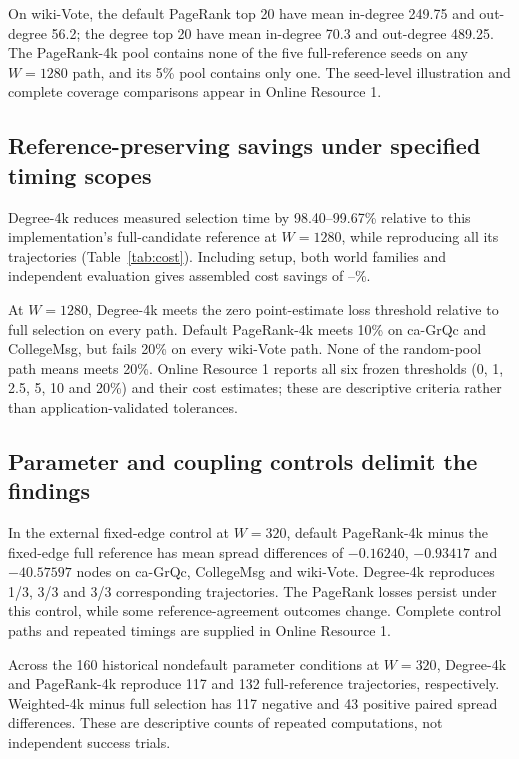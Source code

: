 \documentclass[smallextended]{svjour3}
\begin{document}
On wiki-Vote, the default PageRank top 20 have mean in-degree 249.75 and out-degree 56.2; the degree top 20 have mean in-degree 70.3 and out-degree 489.25. The PageRank-4k pool contains none of the five full-reference seeds on any $W=1280$ path, and its 5\% pool contains only one. The seed-level illustration and complete coverage comparisons appear in Online Resource 1.

\subsection{Reference-preserving savings under specified timing scopes}
Degree-4k reduces measured selection time by 98.40--99.67\% relative to this implementation's full-candidate reference at $W=1280$, while reproducing all its trajectories (Table~\ref{tab:cost}). Including setup, both world families and independent evaluation gives assembled cost savings of \CollegeDegreeSaving{}--\WikiDegreeSaving{}\%.


At $W=1280$, Degree-4k meets the zero point-estimate loss threshold relative to full selection on every path. Default PageRank-4k meets 10\% on ca-GrQc and CollegeMsg, but fails 20\% on every wiki-Vote path. None of the random-pool path means meets 20\%. Online Resource 1 reports all six frozen thresholds (0, 1, 2.5, 5, 10 and 20\%) and their cost estimates; these are descriptive criteria rather than application-validated tolerances.

\subsection{Parameter and coupling controls delimit the findings}

In the external fixed-edge control at $W=320$, default PageRank-4k minus the fixed-edge full reference has mean spread differences of $-0.16240$, $-0.93417$ and $-40.57597$ nodes on ca-GrQc, CollegeMsg and wiki-Vote. Degree-4k reproduces 1/3, 3/3 and 3/3 corresponding trajectories. The PageRank losses persist under this control, while some reference-agreement outcomes change. Complete control paths and repeated timings are supplied in Online Resource 1.

Across the 160 historical nondefault parameter conditions at $W=320$, Degree-4k and PageRank-4k reproduce 117 and 132 full-reference trajectories, respectively. Weighted-4k minus full selection has 117 negative and 43 positive paired spread differences. These are descriptive counts of repeated computations, not independent success trials.
\end{document}
